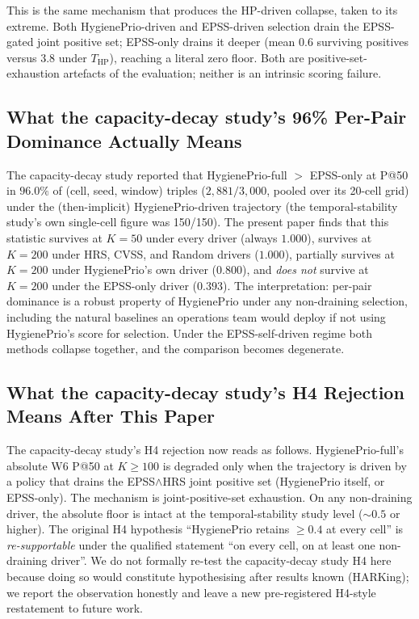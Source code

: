 This is the same mechanism that produces the HP-driven collapse, taken
to its extreme. Both HygienePrio-driven and EPSS-driven selection
drain the EPSS-gated joint positive set; EPSS-only drains it deeper
(mean $0.6$ surviving positives versus $3.8$ under
$T_{\mathrm{HP}}$), reaching a literal zero floor. Both are
positive-set-exhaustion artefacts of the evaluation; neither is an
intrinsic scoring failure.

\subsection{What the capacity-decay study's 96\% Per-Pair Dominance Actually Means}

The capacity-decay study reported that HygienePrio-full $>$ EPSS-only at P@50 in
$96.0\%$ of (cell, seed, window) triples ($2{,}881/3{,}000$, pooled
over its 20-cell grid) under the (then-implicit) HygienePrio-driven
trajectory (the temporal-stability study's own single-cell figure was 150/150). The
present paper finds that this
statistic survives at $K = 50$ under every driver (always $1.000$),
survives at $K = 200$ under HRS, CVSS, and Random drivers
($1.000$), partially survives at $K = 200$ under HygienePrio's own
driver ($0.800$), and \textit{does not} survive at $K = 200$ under
the EPSS-only driver ($0.393$). The interpretation: per-pair
dominance is a robust property of HygienePrio under any
non-draining selection, including the natural baselines an operations
team would deploy if not using HygienePrio's score for selection.
Under the EPSS-self-driven regime both methods collapse together,
and the comparison becomes degenerate.

\subsection{What the capacity-decay study's H4 Rejection Means After This Paper}

The capacity-decay study's H4 rejection now reads as follows. HygienePrio-full's
absolute W6 P@50 at $K \geq 100$ is degraded only when the
trajectory is driven by a policy that drains the EPSS$\wedge$HRS
joint positive set (HygienePrio itself, or EPSS-only). The mechanism
is joint-positive-set exhaustion. On any non-draining driver, the
absolute floor is
intact at the temporal-stability study level ($\sim 0.5$ or higher). The original
H4 hypothesis ``HygienePrio retains $\geq 0.4$ at every cell'' is
\textit{re-supportable} under the qualified statement ``on every cell,
on at least one non-draining driver''. We do not formally re-test the capacity-decay study
H4 here because doing so would constitute hypothesising after results
known (HARKing); we report the observation honestly and leave a
new pre-registered H4-style restatement to future work.

